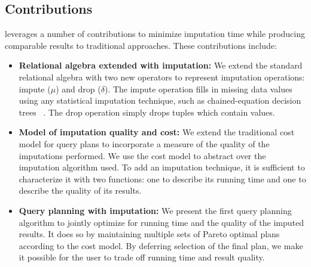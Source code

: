 \subsection{Contributions}
\ProjectName{} leverages a number of contributions to minimize imputation time while producing comparable results to traditional approaches.
These contributions include:
\begin{itemize}
\item \textbf{Relational algebra extended with imputation:}
  We extend the standard relational algebra with two new operators to represent imputation operations: impute ($\mu$) and drop ($\delta$).
  The impute operation fills in missing data values using any statistical imputation
  technique, such as chained-equation decision trees ~\cite{burgette2010multiple}.
  The drop operation simply drops tuples which contain \nullv{} values.
\item \textbf{Model of imputation quality and cost:}
  We extend the traditional cost model for query plans to incorporate a measure of the quality of the imputations performed.
  We use the cost model to abstract over the imputation algorithm used.
  To add an imputation technique, it is sufficient to characterize it with two functions: one to describe its running time and one to describe the quality of its results.
\item \textbf{Query planning with imputation:}
  We present the first query planning algorithm to jointly optimize for running time and the quality of the imputed results.
  It does so by maintaining multiple sets of Pareto optimal plans according to the cost model.
  By deferring selection of the final plan, we make it possible for the user to trade off running time and result quality.
\end{itemize}




